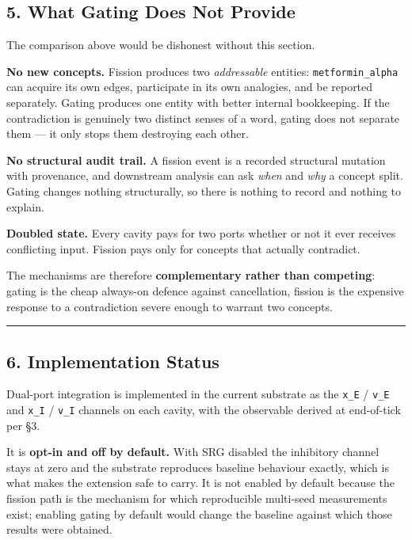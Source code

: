 \documentclass[
  11pt,
  a4paper,
]{article}
\begin{document}
\subsection{5. What Gating Does Not
Provide}\label{what-gating-does-not-provide}

The comparison above would be dishonest without this section.

\textbf{No new concepts.} Fission produces two \emph{addressable}
entities: \texttt{metformin\_alpha} can acquire its own edges,
participate in its own analogies, and be reported separately. Gating
produces one entity with better internal bookkeeping. If the
contradiction is genuinely two distinct senses of a word, gating does
not separate them --- it only stops them destroying each other.

\textbf{No structural audit trail.} A fission event is a recorded
structural mutation with provenance, and downstream analysis can ask
\emph{when} and \emph{why} a concept split. Gating changes nothing
structurally, so there is nothing to record and nothing to explain.

\textbf{Doubled state.} Every cavity pays for two ports whether or not
it ever receives conflicting input. Fission pays only for concepts that
actually contradict.

The mechanisms are therefore \textbf{complementary rather than
competing}: gating is the cheap always-on defence against cancellation,
fission is the expensive response to a contradiction severe enough to
warrant two concepts.

\begin{center}\rule{0.5\linewidth}{0.5pt}\end{center}

\subsection{6. Implementation Status}\label{implementation-status}

Dual-port integration is implemented in the current substrate as the
\texttt{x\_E} / \texttt{v\_E} and \texttt{x\_I} / \texttt{v\_I} channels
on each cavity, with the observable derived at end-of-tick per §3.

It is \textbf{opt-in and off by default.} With SRG disabled the
inhibitory channel stays at zero and the substrate reproduces baseline
behaviour exactly, which is what makes the extension safe to carry. It
is not enabled by default because the fission path is the mechanism for
which reproducible multi-seed measurements exist; enabling gating by
default would change the baseline against which those results were
obtained.
\end{document}
